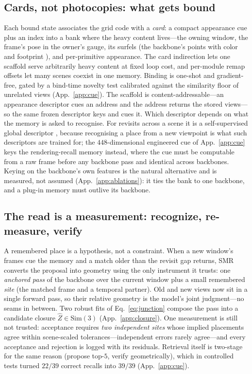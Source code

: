 \documentclass{article}
\newcommand{\smr}{\textsc{SMR}}
\newcommand{\simthree}{\mathrm{Sim}(3)}
\begin{document}
\subsection{Cards, not photocopies: what gets bound}
\label{sec:content}
Each bound state associates the grid code with a \emph{card}: a compact
appearance cue plus an index into a bank where the heavy content lives---the
owning window, the frame's pose in the owner's gauge, its surfels (the
backbone's points with color and footprint \citep{surfels,elasticfusion}),
and per-primitive appearance. The card indirection lets one scaffold serve
arbitrarily heavy content at fixed loop cost, and per-module remap offsets
let many scenes coexist in one memory. Binding is one-shot and
gradient-free, gated by a bind-time novelty test calibrated against the
similarity floor of unrelated views (App.~\ref{app:cue}). The scaffold is content-addressable---an
appearance descriptor cues an address and the address returns the stored
views---so the same frozen descriptor keys and cues it. Which descriptor
depends on what the memory is asked to recognise. For revisits across a
scene it is a self-supervised global descriptor \citep{dinov2}, because
recognising a place from a new viewpoint is what such descriptors are trained
for; the $448$-dimensional engineered cue of App.~\ref{app:cue} keys the
rendering-recall memory instead, where the cue must be computable from a raw
frame before any backbone pass and identical across backbones. Keying on the
backbone's own features is the natural alternative and is measured, not
assumed (App.~\ref{app:ablations}): it ties the bank to one backbone, and a
plug-in memory must outlive its backbone.

\subsection{The read is a measurement: recognize, re-measure, verify}
\label{sec:read}
A remembered place is a hypothesis, not a constraint. When a new window's
frames cue the memory and a match older than the revisit gap returns,
\smr{} converts the proposal into geometry using the only instrument it
trusts: one \emph{anchored pass} of the backbone over the current window
plus a small remembered \emph{site} (the matched frame and a temporal
partner). Old and new views now sit in a single forward pass, so their
relative geometry is the model's joint judgment---no seams in between. Two
robust fits of Eq.~\ref{eq:junction} compose the pass into a candidate
closure $\hat Z\in\simthree$ (App.~\ref{app:closure}). One measurement is
still not trusted: acceptance requires \emph{two independent sites} whose
implied placements agree within scene-scaled tolerances---independent errors
rarely agree---and every acceptance and rejection is logged with its
residuals. Retrieval itself is two-stage for the same reason (propose
top-$5$, verify geometrically), which in controlled tests turned $22/39$
correct recalls into $39/39$ (App.~\ref{app:cue}).
\end{document}
